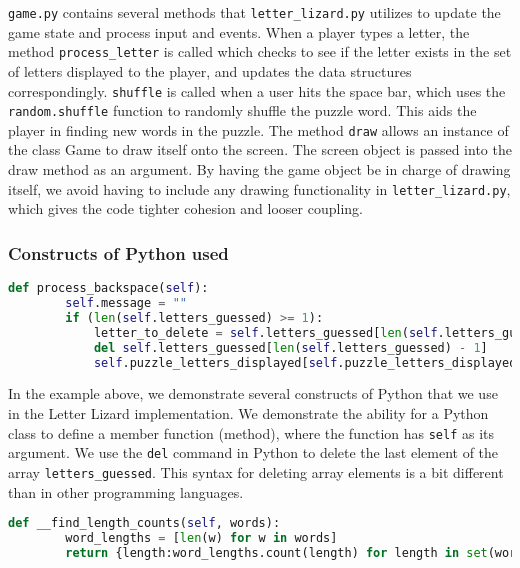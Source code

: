 	\texttt{game.py} contains several methods that \texttt{letter\_lizard.py} utilizes to update the game state and process input and events. When a player types a letter, the method \texttt{process\_letter} is called which checks to see if the letter exists in the set of letters displayed to the player, and updates the data structures correspondingly. \texttt{shuffle} is called when a user hits the space bar, which uses the \texttt{random.shuffle} function to randomly shuffle the puzzle word. This aids the player in finding new words in the puzzle. The method \texttt{draw} allows an instance of the class Game to draw itself onto the screen. The screen object is passed into the draw method as an argument. By having the game object be in charge of drawing itself, we avoid having to include any drawing functionality in \texttt{letter\_lizard.py}, which gives the code tighter cohesion and looser coupling.
	
\subsubsection{Constructs of Python used}
\label{pyconstructs}

\begin{lstlisting}[language=Python, %
  caption=Basic constructs of Python used]
    def process_backspace(self):
        self.message = ""
        if (len(self.letters_guessed) >= 1):
            letter_to_delete = self.letters_guessed[len(self.letters_guessed) - 1]
            del self.letters_guessed[len(self.letters_guessed) - 1]
            self.puzzle_letters_displayed[self.puzzle_letters_displayed.index('')] = letter_to_delete
\end{lstlisting}
In the example above, we demonstrate several constructs of Python that we use in the Letter Lizard implementation. We demonstrate the ability for a Python class to define a member function (method), where the function has \texttt{self} as its argument. We use the \texttt{del} command in Python to delete the last element of the array \texttt{letters\_guessed}. This syntax for deleting array elements is a bit different than in other programming languages.

\begin{lstlisting}[language=Python, %
  caption=Demonstration of functional programming constructs in Python]
    def __find_length_counts(self, words):
        word_lengths = [len(w) for w in words]
        return {length:word_lengths.count(length) for length in set(word_lengths)}
\end{lstlisting}

